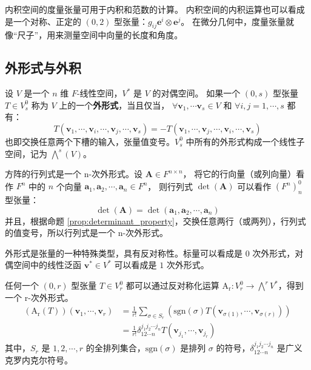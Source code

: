 \begin{note}
    内积空间的度量张量可用于内积和范数的计算。
    内积空间的内积运算也可以看成是一个对称、正定的 $(0,2)$ 型张量：$g_{ij} \mathbf{e}^i \otimes \mathbf{e}^j$。
    在微分几何中，度量张量就像“尺子”，用来测量空间中向量的长度和角度。
\end{note}

\vspace{1em}
\subsection{外形式与外积}

\begin{definition}
    设 $V$ 是一个 $n$ 维 $F$-线性空间，$V^*$ 是 $V$ 的对偶空间。
    如果一个 $(0,s)$ 型张量 $T \in V^0_s$ 称为 $V$ 上的一个\textbf{外形式}，当且仅当，
    $\forall \mathbf{v}_1,\cdots\mathbf{v}_s \in V$ 和 $\forall i,j = 1,\cdots,s$ 都有：
    \[
        T(\mathbf{v}_1,\cdots,\mathbf{v}_i,\cdots,\mathbf{v}_j,\cdots,\mathbf{v}_s) = -T(\mathbf{v}_1,\cdots,\mathbf{v}_j,\cdots,\mathbf{v}_i,\cdots,\mathbf{v}_s)
    \]
    也即交换任意两个下槽的输入，张量值变号。$V^0_s$ 中所有的外形式构成一个线性子空间，记为 $\bigwedge^s(V)$。
    \label{def:exterior_form}
\end{definition}

\begin{example}
    方阵的行列式是一个 n-次外形式。设 $\mathbf{A}\in F^{n\times n}$，
    将它的行向量（或列向量）看作 $F^n$ 中的 $n$ 个向量 $\mathbf{a}_1,\mathbf{a}_2,\cdots,\mathbf{a}_n\in F^n$，
    则行列式 $\det(\mathbf{A})$ 可以看作 $(F^n)^0_n$ 型张量：
    \[
        \det(\mathbf{A}) = \det(\mathbf{a}_1,\mathbf{a}_2,\cdots,\mathbf{a}_n)
    \]
    并且，根据命题 \ref{prop:determinant_property}，交换任意两行（或两列），行列式的值变号，所以行列式是一个 n-次外形式。
    \label{ex:determinant_exterior_form}
\end{example}

\begin{note}
    外形式是张量的一种特殊类型，具有反对称性。标量可以看成是 $0$ 次外形式，对偶空间中的线性泛函 $\mathbf{v}^*\in V^*$ 可以看成是 $1$ 次外形式。
\end{note}
\vspace{1em}

\begin{definition}[反对称化运算]
    任何一个 $(0,r)$ 型张量 $T\in V^0_r$ 都可以通过反对称化运算 $\mathrm{A_r}:V^0_r\to \bigwedge^rV^*$，得到一个 r-次外形式。
    \begin{align*}
        (\mathrm{A_r}(T))(\mathbf{v}_1,\cdots,\mathbf{v}_r) &= \frac{1}{r!}\sum_{\sigma \in S_r} \left( \mathrm{sgn}(\sigma) T(\mathbf{v}_{\sigma(1)},\cdots,\mathbf{v}_{\sigma(r)}) \right) \\
        &= \frac{1}{r!} \delta_{1 2 \cdots n}^{j_1 j_2 \cdots j_n}  T(\mathbf{v}_{j_1},\cdots,\mathbf{v}_{j_r})
    \end{align*}
    其中，$S_r$ 是 $1,2,\cdots,r$ 的全排列集合，$\mathrm{sgn}(\sigma)$ 是排列 $\sigma$ 的符号，$\delta_{1 2 \cdots n}^{j_1 j_2 \cdots j_n}$ 是广义克罗内克尔符号。
\end{definition}

